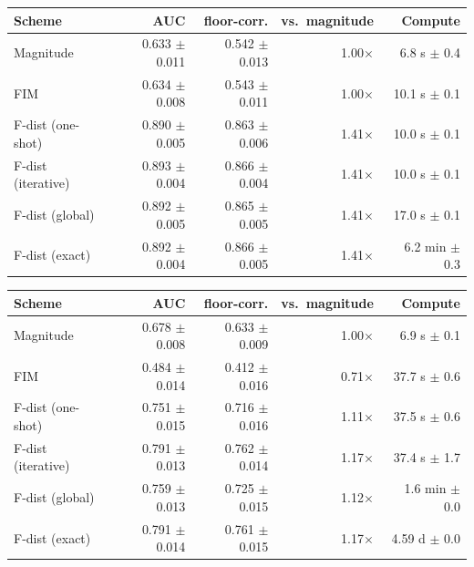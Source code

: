 \begin{tabular}{lrrrr}
\toprule
Scheme & AUC & floor-corr. & vs.\ magnitude & Compute \\
\midrule
Magnitude & 0.633 $\pm$ 0.011 & 0.542 $\pm$ 0.013 & 1.00$\times$ & 6.8 s $\pm$ 0.4 \\
FIM & 0.634 $\pm$ 0.008 & 0.543 $\pm$ 0.011 & 1.00$\times$ & 10.1 s $\pm$ 0.1 \\
F-dist (one-shot) & 0.890 $\pm$ 0.005 & 0.863 $\pm$ 0.006 & 1.41$\times$ & 10.0 s $\pm$ 0.1 \\
F-dist (iterative) & 0.893 $\pm$ 0.004 & 0.866 $\pm$ 0.004 & 1.41$\times$ & 10.0 s $\pm$ 0.1 \\
F-dist (global) & 0.892 $\pm$ 0.005 & 0.865 $\pm$ 0.005 & 1.41$\times$ & 17.0 s $\pm$ 0.1 \\
F-dist (exact) & 0.892 $\pm$ 0.004 & 0.866 $\pm$ 0.005 & 1.41$\times$ & 6.2 min $\pm$ 0.3 \\
\bottomrule
\end{tabular}

\begin{tabular}{lrrrr}
\toprule
Scheme & AUC & floor-corr. & vs.\ magnitude & Compute \\
\midrule
Magnitude & 0.678 $\pm$ 0.008 & 0.633 $\pm$ 0.009 & 1.00$\times$ & 6.9 s $\pm$ 0.1 \\
FIM & 0.484 $\pm$ 0.014 & 0.412 $\pm$ 0.016 & 0.71$\times$ & 37.7 s $\pm$ 0.6 \\
F-dist (one-shot) & 0.751 $\pm$ 0.015 & 0.716 $\pm$ 0.016 & 1.11$\times$ & 37.5 s $\pm$ 0.6 \\
F-dist (iterative) & 0.791 $\pm$ 0.013 & 0.762 $\pm$ 0.014 & 1.17$\times$ & 37.4 s $\pm$ 1.7 \\
F-dist (global) & 0.759 $\pm$ 0.013 & 0.725 $\pm$ 0.015 & 1.12$\times$ & 1.6 min $\pm$ 0.0 \\
F-dist (exact) & 0.791 $\pm$ 0.014 & 0.761 $\pm$ 0.015 & 1.17$\times$ & 4.59 d $\pm$ 0.0 \\
\bottomrule
\end{tabular}

